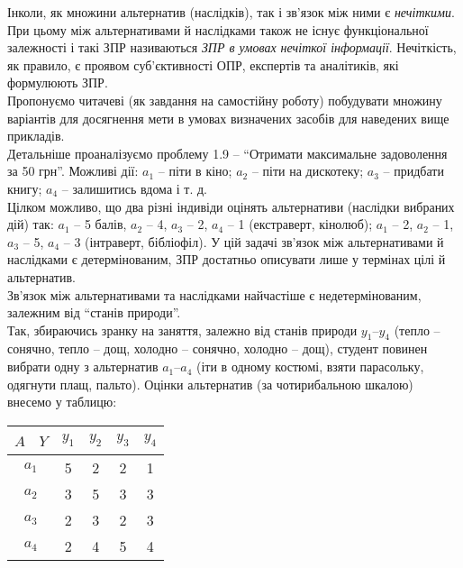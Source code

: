 \begin{enumerate}
    Інколи, як множини альтернатив (наслідків), так і зв'язок між ними є \textit{нечіткими}. При цьому між альтернативами й наслідками також не існує функціональної залежності і такі ЗПР називаються \textit{ЗПР в умовах нечіткої інформації}. Нечіткість, як правило, є проявом суб'єктивності ОПР, експертів та аналітиків, які формулюють ЗПР. \\
    
    Пропонуємо читачеві (як завдання на самостійну роботу) побудувати множину варіантів для досягнення мети в умовах визначених засобів для наведених вище прикладів. \\
    
    Детальніше проаналізуємо проблему 1.9 -- ``Отримати максимальне задоволення за 50 грн''. Можливі дії: $a_1$ -- піти в кіно; $a_2$ -- піти на дискотеку; $a_3$ -- придбати книгу; $a_4$ -- залишитись вдома і т. д. \\
    
    Цілком можливо, що два різні індивіди оцінять альтернативи (наслідки вибраних дій) так: $a_1$ -- 5 балів, $a_2$ -- 4, $a_3$ -- 2, $a_4$ -- 1 (екстраверт, кінолюб); $a_1$ -- 2, $a_2$ -- 1, $a_3$ -- 5, $a_4$ -- 3 (інтраверт, бібліофіл). У цій задачі зв'язок між альтернативами й наслідками є детермінованим, ЗПР достатньо описувати лише у термінах цілі й альтернатив. \\
    
    Зв'язок між альтернативами та наслідками найчастіше є недетермінованим, залежним від ``станів природи''. \\
    
    Так, збираючись зранку на заняття, залежно від станів природи $y_1$--$y_4$ (тепло -- сонячно, тепло -- дощ, холодно -- сонячно, холодно -- дощ), студент повинен вибрати одну з альтернатив $a_1$--$a_4$ (іти в одному костюмі, взяти парасольку, одягнути плащ, пальто). Оцінки альтернатив (за чотирибальною шкалою) внесемо у таблицю:
    \begin{table}[H]
        \centering
        \begin{tabular}{|c|c|c|c|c|}
            \hline
            $A$ \ $Y$ & $y_1$ & $y_2$ & $y_3$ & $y_4$ \\ \hline
            $a_1$ & 5 & 2 & 2 & 1 \\ \hline
            $a_2$ & 3 & 5 & 3 & 3 \\ \hline
            $a_3$ & 2 & 3 & 2 & 3 \\ \hline
            $a_4$ & 2 & 4 & 5 & 4 \\ \hline
        \end{tabular}
    \end{table}
    

\end{enumerate}
